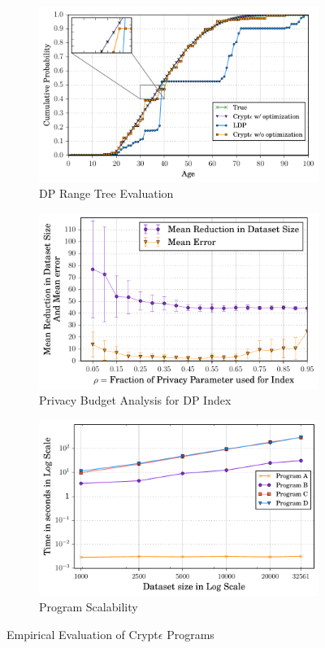 \begin{figure}[ht]
    \begin{subfigure}[b]{0.25\linewidth}
     \includegraphics[width=1\linewidth]{cdf_final.pdf}
        \caption{DP Range Tree Evaluation}
        \end{subfigure}
        \begin{subfigure}[b]{0.25\linewidth}
     \includegraphics[width=1\linewidth]{index_new.pdf}
        \caption{Privacy Budget Analysis for DP Index}
        \label{Index}
    \end{subfigure}
    \begin{subfigure}[b]{0.25\linewidth}
     \includegraphics[width=1\linewidth]{scale_final.pdf}
        \caption{\system Program Scalability}
        \label{Scale}
    \end{subfigure}
   \caption{Empirical Evaluation of Crypt$\epsilon$ Programs}
\end{figure}
